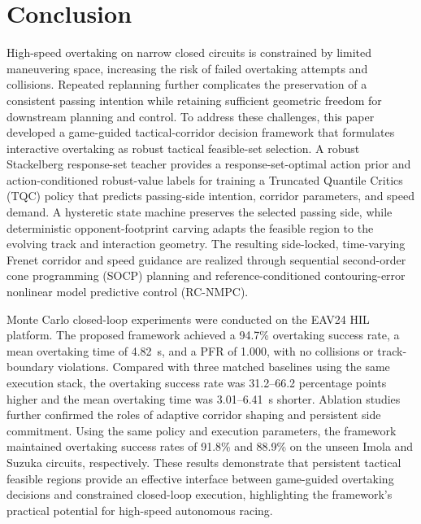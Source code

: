 \documentclass[journal,twoside,web]{ieeecolor}
\begin{document}
\section{Conclusion}\label{sec:conclusion}

High-speed overtaking on narrow closed circuits is constrained by limited maneuvering space, increasing the risk of failed overtaking attempts and collisions. Repeated replanning further complicates the preservation of a consistent passing intention while retaining sufficient geometric freedom for downstream planning and control. To address these challenges, this paper developed a game-guided tactical-corridor decision framework that formulates interactive overtaking as robust tactical feasible-set selection. A robust Stackelberg response-set teacher provides a response-set-optimal action prior and action-conditioned robust-value labels for training a Truncated Quantile Critics (TQC) policy that predicts passing-side intention, corridor parameters, and speed demand. A hysteretic state machine preserves the selected passing side, while deterministic opponent-footprint carving adapts the feasible region to the evolving track and interaction geometry. The resulting side-locked, time-varying Frenet corridor and speed guidance are realized through sequential second-order cone programming (SOCP) planning and reference-conditioned contouring-error nonlinear model predictive control (RC-NMPC).

Monte Carlo closed-loop experiments were conducted on the EAV24 HIL platform. The proposed framework achieved a 94.7\% overtaking success rate, a mean overtaking time of 4.82~s, and a PFR of 1.000, with no collisions or track-boundary violations. Compared with three matched baselines using the same execution stack, the overtaking success rate was 31.2--66.2 percentage points higher and the mean overtaking time was 3.01--6.41~s shorter. Ablation studies further confirmed the roles of adaptive corridor shaping and persistent side commitment. Using the same policy and execution parameters, the framework maintained overtaking success rates of 91.8\% and 88.9\% on the unseen Imola and Suzuka circuits, respectively. These results demonstrate that persistent tactical feasible regions provide an effective interface between game-guided overtaking decisions and constrained closed-loop execution, highlighting the framework's practical potential for high-speed autonomous racing.
\end{document}
